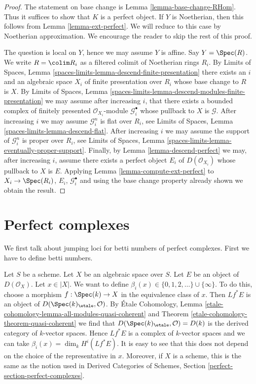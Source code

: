 \begin{proof}
The statement on base change is Lemma \ref{lemma-base-change-RHom}.
Thus it suffices to show that $K$ is a perfect object. If $Y$ is
Noetherian, then this follows from Lemma \ref{lemma-ext-perfect}.
We will reduce to this case by Noetherian approximation.
We encourage the reader to skip the rest of this proof.

\medskip\noindent
The question is local on $Y$, hence we may assume $Y$ is affine.
Say $Y = \Spec(R)$. We write $R = \colim R_i$ as a filtered colimit
of Noetherian rings $R_i$. By Limits of Spaces, Lemma
\ref{spaces-limits-lemma-descend-finite-presentation}
there exists an $i$ and an algebraic space $X_i$ of finite presentation
over $R_i$ whose base change to $R$ is $X$. By
Limits of Spaces, Lemma
\ref{spaces-limits-lemma-descend-modules-finite-presentation}
we may assume after increasing $i$, that there exists a bounded
complex of finitely
presented $\mathcal{O}_{X_i}$-module $\mathcal{G}_i^\bullet$ whose
pullback to $X$ is $\mathcal{G}$. After increasing $i$
we may assume $\mathcal{G}_i^n$ is flat over $R_i$, see
Limits of Spaces, Lemma
\ref{spaces-limits-lemma-descend-flat}.
After increasing $i$ we may assume the support of $\mathcal{G}_i^n$
is proper over $R_i$, see
Limits of Spaces, Lemma \ref{spaces-limits-lemma-eventually-proper-support}.
Finally, by Lemma \ref{lemma-descend-perfect}
we may, after increasing $i$, assume there exists a perfect
object $E_i$ of $D(\mathcal{O}_{X_i})$ whose pullback to
$X$ is $E$. Applying Lemma \ref{lemma-compute-ext-perfect}
to $X_i \to \Spec(R_i)$, $E_i$, $\mathcal{G}_i^\bullet$ and using the
base change property already shown we obtain the result.
\end{proof}









\section{Perfect complexes}
\label{section-perfect-complexes}

\noindent
We first talk about jumping loci for betti numbers of perfect complexes.
First we have to define betti numbers.

\medskip\noindent
Let $S$ be a scheme. Let $X$ be an algebraic space over $S$.
Let $E$ be an object of $D(\mathcal{O}_X)$.
Let $x \in |X|$. We want to define
$\beta_i(x) \in \{0, 1, 2, \ldots \} \cup \{\infty\}$.
To do this, choose a morphism $f : \Spec(k) \to X$ in the equivalence
class of $x$. Then $Lf^*E$ is an object of $D(\Spec(k)_\etale, \mathcal{O})$.
By \'Etale Cohomology, Lemma
\ref{etale-cohomology-lemma-all-modules-quasi-coherent} and
Theorem \ref{etale-cohomology-theorem-quasi-coherent}
we find that $D(\Spec(k)_\etale, \mathcal{O}) = D(k)$ is the
derived category of $k$-vector spaces.
Hence $Lf^*E$ is a complex of $k$-vector spaces and we can
take $\beta_i(x) = \dim_k H^i(Lf^*E)$. It is easy to see that
this does not depend on the choice of the representative in $x$.
Moreover, if $X$ is a scheme, this is the same as the notion
used in Derived Categories of Schemes, Section
\ref{perfect-section-perfect-complexes}.

